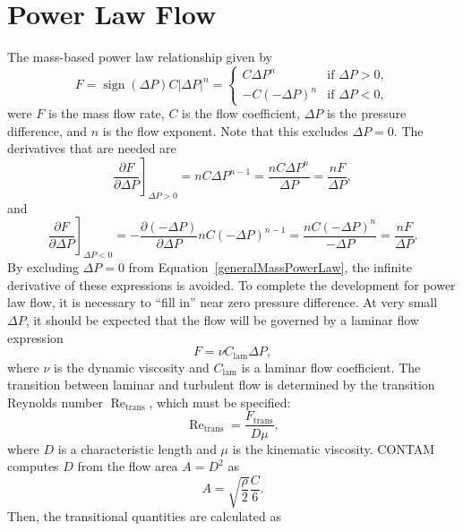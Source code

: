 \documentclass[10pt]{report}
\DeclareMathOperator{\sign}{sign}
\DeclareMathOperator{\reynum}{Re}
\begin{document}
\section{Power Law Flow}\label{PowerLawSection}
The mass-based power law relationship given by
\begin{equation}\label{generalMassPowerLaw}
F = \sign(\Delta P)C|\Delta P|^n
  = \begin{cases}
  C\Delta P^n &\text{if $\Delta P > 0$},\\
  -C(-\Delta P)^n &\text{if $\Delta P < 0$},
  \end{cases}
\end{equation}
were $F$ is the mass flow rate, $C$ is the flow coefficient, $\Delta P$
is the pressure difference, and $n$ is the flow exponent. Note that this
excludes $\Delta P=0$. The derivatives
that are needed are
\begin{equation}
\left.\frac{\partial F}{\partial \Delta P}\right]_{\Delta P>0} 
  = nC\Delta P^{n-1}
  = \frac{nC\Delta P^n}{\Delta P} = \frac{nF}{\Delta P},
\end{equation}
and
\begin{equation}
\left.\frac{\partial F}{\partial \Delta P}\right]_{\Delta P<0} 
  = -\frac{\partial(-\Delta P)}{\partial\Delta P}nC(-\Delta P)^{n-1}
  = \frac{nC(-\Delta P)^n}{-\Delta P} = \frac{nF}{\Delta P}.
\end{equation}
By excluding $\Delta P=0$ from Equation~\ref{generalMassPowerLaw}, the 
infinite derivative of these expressions is avoided. To complete the
development for power law flow, it is necessary to ``fill in'' near zero
pressure difference. At very small $\Delta P$, it should be expected that
the flow will be governed by a laminar flow expression
\begin{equation}
F=\nu C_\text{lam}\Delta P,
\end{equation}
where $\nu$ is the dynamic viscosity and $C_\text{lam}$ is a laminar flow
coefficient. The transition between laminar and turbulent flow is
determined by the transition Reynolds number
$\reynum_\text{trans}$, which must be specified:
\begin{equation}
\reynum_\text{trans} = \frac{F_\text{trans}}{D\mu},
\end{equation}
where $D$ is a characteristic length and $\mu$ is the kinematic viscosity.
CONTAM computes $D$ from the flow area $A=D^2$ as
\begin{equation}
A = \sqrt{\frac{\rho}{2}}\frac{C}{6}.
\end{equation}
Then, the transitional quantities are calculated as
\end{document}
